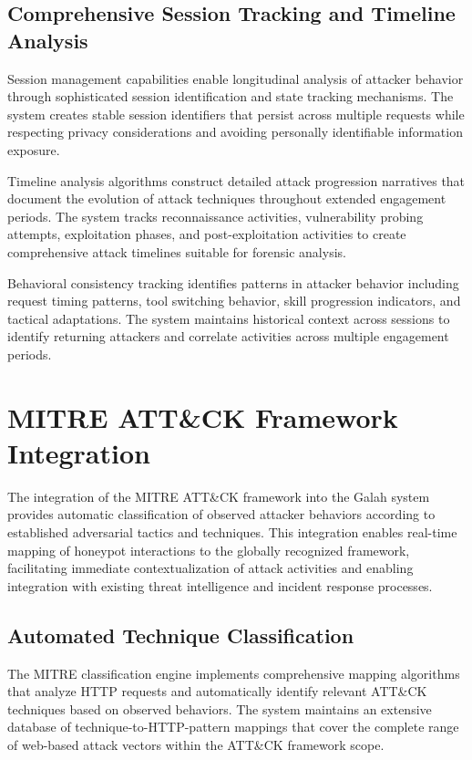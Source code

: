 \subsection{Comprehensive Session Tracking and Timeline Analysis}

Session management capabilities enable longitudinal analysis of attacker behavior through sophisticated session identification and state tracking mechanisms. The system creates stable session identifiers that persist across multiple requests while respecting privacy considerations and avoiding personally identifiable information exposure.

Timeline analysis algorithms construct detailed attack progression narratives that document the evolution of attack techniques throughout extended engagement periods. The system tracks reconnaissance activities, vulnerability probing attempts, exploitation phases, and post-exploitation activities to create comprehensive attack timelines suitable for forensic analysis.

Behavioral consistency tracking identifies patterns in attacker behavior including request timing patterns, tool switching behavior, skill progression indicators, and tactical adaptations. The system maintains historical context across sessions to identify returning attackers and correlate activities across multiple engagement periods.

\section{MITRE ATT\&CK Framework Integration}

The integration of the MITRE ATT\&CK framework into the Galah system provides automatic classification of observed attacker behaviors according to established adversarial tactics and techniques. This integration enables real-time mapping of honeypot interactions to the globally recognized framework, facilitating immediate contextualization of attack activities and enabling integration with existing threat intelligence and incident response processes.

\subsection{Automated Technique Classification}

The MITRE classification engine implements comprehensive mapping algorithms that analyze HTTP requests and automatically identify relevant ATT\&CK techniques based on observed behaviors. The system maintains an extensive database of technique-to-HTTP-pattern mappings that cover the complete range of web-based attack vectors within the ATT\&CK framework scope.

